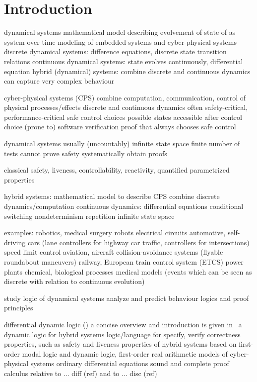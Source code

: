 \chapter{Introduction}

	dynamical systems
	mathematical model
	describing evolvement of state of as system over time
	modeling of embedded systems and cyber-physical systems
    discrete dynamical systems: difference equations, discrete state transition relations
    continuous dynamical systems: state evolves continuously, differential equation
    hybrid (dynamical) systems: combine discrete and continuous dynamics
    can capture very complex behaviour


	cyber-physical systems (CPS)
	combine computation, communication, control of physical processes/effects
	discrete and continuous dynamics
	often safety-critical, performance-critical
    safe control choices
    possible states accessible after control choice
	(prone to) software verification
    proof that always chooses safe control

    dynamical systems usually (uncountably) infinite state space
    finite number of tests cannot prove safety
    systematically obtain proofs

    classical safety, liveness, controllability, reactivity, quantified parametrized properties

	hybrid systems: mathematical model to describe CPS
	combine discrete dynamics/computation
	continuous dynamics: differential equations
    conditional switching
    nondeterminism
    repetition
	infinite state space

	examples:
    robotics, medical surgery robots
    electrical circuits
	automotive, self-driving cars (lane controllers for highway car traffic, controllers for intersections)
    speed limit control
	aviation, aircraft collision-avoidance systems (flyable roundabout maneuvers)
	railway, European train control system (ETCS)
    power plants
    chemical, biological processes
    medical models (events which can be seen as discrete with relation to continuous evolution)

	study logic of dynamical systems
    analyze and predict behaviour
    logics and proof principles

    differential dynamic logic (\dL)
    a concise overview and introduction is given in~\cite{Platzer12LogicsDynSys}
    a dynamic logic for hybrid systems
    logic/language for specify, verify correctness properties, such as safety and liveness properties
    of hybrid systems
    based on first-order modal logic and dynamic logic, first-order real arithmetic
    models of cyber-physical systems
    ordinary differential equations
    sound and complete proof calculus relative to ... diff (ref)
    and to ... disc (ref)

